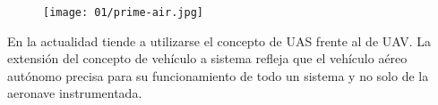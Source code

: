 \documentclass[../main.tex]{subfiles}
\begin{document}
\begin{figure}[ht]
 	{\texttt{[image: 01/prime-air.jpg]}}
\end{figure}

% 

        
     

En la actualidad tiende a utilizarse el concepto de UAS frente al de UAV. La extensión del concepto de vehículo a sistema refleja que el vehículo aéreo autónomo precisa para su funcionamiento de todo un sistema y no solo de la aeronave instrumentada.
\end{document}
